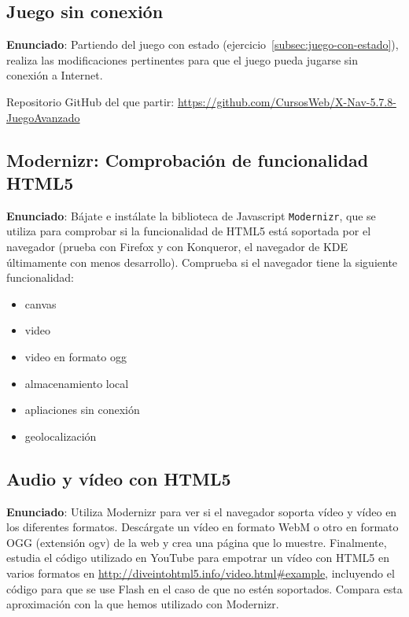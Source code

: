 \subsection{Juego sin conexión}
\label{subsec:juego-sin-conexion}

\textbf{Enunciado}: Partiendo del juego con estado (ejercicio~\ref{subsec:juego-con-estado}), realiza las modificaciones pertinentes para que el juego pueda jugarse sin conexión a Internet.

Repositorio GitHub del que partir: \url{https://github.com/CursosWeb/X-Nav-5.7.8-JuegoAvanzado}

\subsection{Modernizr: Comprobación de funcionalidad HTML5}
\label{subsec:modernizr}

\textbf{Enunciado}: Bájate e instálate la biblioteca de Javascript \texttt{Modernizr}, que se utiliza para comprobar si la funcionalidad de HTML5 está soportada por el navegador (prueba con Firefox y con Konqueror, el navegador de KDE últimamente con menos desarrollo). Comprueba si el navegador tiene la siguiente funcionalidad:

\begin{itemize}
  \item canvas
  \item video
  \item video en formato ogg
  \item almacenamiento local
  \item apliaciones sin conexión
  \item geolocalización
\end{itemize}  


\subsection{Audio y vídeo con HTML5}
\label{subsec:audio-video}

\textbf{Enunciado}: Utiliza Modernizr para ver si el navegador soporta vídeo y vídeo en los diferentes formatos. Descárgate un vídeo en formato WebM o otro en formato OGG (extensión ogv) de la web y crea una página que lo muestre. Finalmente, estudia el código utilizado en YouTube para empotrar un vídeo con HTML5 en varios formatos en \url{http://diveintohtml5.info/video.html#example}, incluyendo el código para que se use Flash en el caso de que no estén soportados. Compara esta aproximación con la que hemos utilizado con Modernizr.


